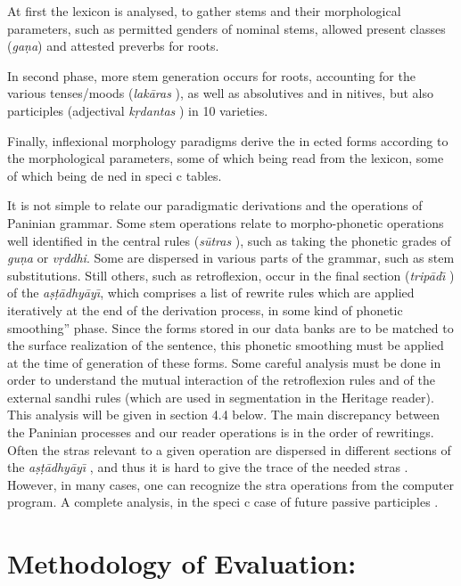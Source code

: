 \documentclass[11pt]{article}
\begin{document}
At first the lexicon is analysed, to gather stems and their morphological parameters, such as permitted genders of nominal stems, allowed present classes (\textit{ga\d{n}a}) and attested preverbs for roots. 

In second phase, more stem generation occurs for roots, accounting  for the various tenses/moods (\textit{lak\={a}ras} ), as well as absolutives and in nitives, but also participles (adjectival \textit{k\d{r}dantas} ) in 10 varieties. 

Finally, inflexional  morphology  paradigms  derive  the  in ected  forms  according  to  the morphological parameters, some of which being read from the lexicon, some of which being de ned in speci c tables. 

It is not simple to relate our paradigmatic derivations and the operations of Paninian grammar. Some stem operations relate to morpho-phonetic operations well identified in the central rules (\textit{s\={u}tras} ), such as taking the phonetic grades of \textit{gu\d{n}a} or \textit{v\d{r}ddhi}. Some are dispersed in various parts of the grammar, such as stem substitutions. Still others, such as retroflexion, occur in the  final section (\textit{trip\={a}d\={\i}} )  of  the \textit{a\d{s}\d{t}\={a}dhy\={a}y\={\i}},  which  comprises  a  list  of  rewrite  rules  which  are applied iteratively at the end of the derivation process, in some kind of phonetic smoothing'' phase. Since the forms stored in our data banks are to be matched to the surface realization of the sentence, this phonetic smoothing must be applied at the time of generation of these forms. Some careful analysis must be done in order to understand the mutual interaction of the retroflexion rules and of the external sandhi rules (which are used in segmentation in the Heritage reader). This analysis will be given in section 4.4 below. The main discrepancy between the Paninian processes and our reader operations is in the order of rewritings. Often the stras relevant to a given operation are dispersed in different sections of the \textit{a\d{s}\d{t}\={a}dhy\={a}y\={\i}} , and thus it is hard to give the trace of the needed stras . However, in many cases, one can recognize the stra operations from the computer program. A complete analysis, in the speci c case of future passive participles .


\section{Methodology of Evaluation:}
\label{sect:methodology}
\end{document}
